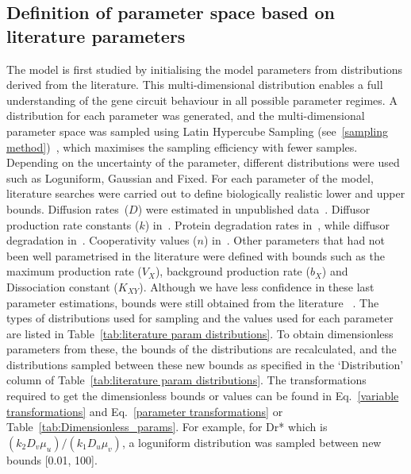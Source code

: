 \subsection{Definition of parameter space based on literature parameters}\label{Definition of parameter space based on literature parametrisation}
The model is first studied by initialising the model parameters from distributions derived from the literature.
This multi-dimensional distribution enables a full understanding of the gene circuit behaviour in all possible parameter regimes.
A distribution for each parameter was generated,
and the multi-dimensional parameter space was sampled using Latin Hypercube Sampling
(see~\ref{sampling method})~\parencite{Iman2014, Bergstra2012},
which maximises the sampling efficiency with fewer samples.
Depending on the uncertainty of the parameter, different distributions were used such as Loguniform, Gaussian and Fixed.
 For each parameter of the model,
literature searches were carried out to define biologically realistic lower and upper bounds.
Diffusion rates~($D$) were estimated in unpublished data~\parencite{tica_diffusers}.
Diffusor production rate constants ($k$) in~\cite{Schaefer1996, Pai2009}.
Protein degradation rates in~\cite{Andersen1998}, while diffusor degradation in~\cite{kaufmann2005revisiting}.
Cooperativity values ($n$) in~\cite{Babic2007}.
Other parameters that had not been well parametrised in the literature were defined with bounds such as the maximum production rate
($V_{X}$),
background production rate ($b_{X}$) and Dissociation constant
($K_{XY}$).
Although we have less confidence in these last parameter estimations,
bounds were still obtained from the literature ~\parencite{Scholes2019, Pusnik2019}.
The types of distributions
used for sampling and the values used for each parameter are listed in Table~\ref{tab:literature param distributions}.
To obtain dimensionless parameters from these, the bounds of the distributions are recalculated,
and the distributions sampled between these new bounds as specified in the ‘Distribution’
column of Table~\ref{tab:literature param distributions}.
The transformations
required to get the dimensionless bounds or values can be found in Eq.~\ref{variable transformations} and Eq.~\ref{parameter transformations} or Table~\ref{tab:Dimensionless_params}.
For example, for Dr* which is $(k_{2}D_{v}\mu_{u})/(k_{1}D_{u}\mu_{v})$,
a loguniform distribution was sampled between new bounds [0.01, 100].
